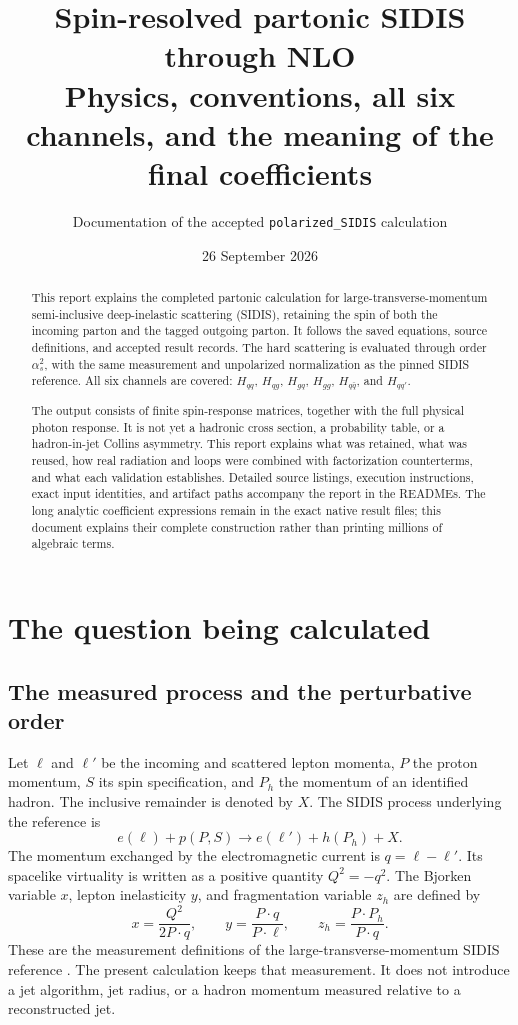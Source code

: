 \documentclass[11pt,a4paper]{article}
\title{Spin-resolved partonic SIDIS through NLO\\
\large Physics, conventions, all six channels, and the meaning of the final coefficients}
\author{Documentation of the accepted \texttt{polarized\_SIDIS} calculation}
\date{26 September 2026}
\newcommand{\as}{\alpha_s}
\begin{document}
\maketitle
\begin{abstract}
This report explains the completed partonic calculation for large-transverse-momentum semi-inclusive deep-inelastic scattering (SIDIS), retaining the spin of both the incoming parton and the tagged outgoing parton. It follows the saved equations, source definitions, and accepted result records. The hard scattering is evaluated through order $\as^2$, with the same measurement and unpolarized normalization as the pinned SIDIS reference. All six channels are covered: $H_{qq}$, $H_{qg}$, $H_{gq}$, $H_{gg}$, $H_{q\bar q}$, and $H_{qq'}$.

The output consists of finite spin-response matrices, together with the full physical photon response. It is not yet a hadronic cross section, a probability table, or a hadron-in-jet Collins asymmetry. This report explains what was retained, what was reused, how real radiation and loops were combined with factorization counterterms, and what each validation establishes. Detailed source listings, execution instructions, exact input identities, and artifact paths accompany the report in the READMEs. The long analytic coefficient expressions remain in the exact native result files; this document explains their complete construction rather than printing millions of algebraic terms.
\end{abstract}
\tableofcontents
\newpage

\section{The question being calculated}
\subsection{The measured process and the perturbative order}
Let $\ell$ and $\ell'$ be the incoming and scattered lepton momenta, $P$ the proton momentum, $S$ its spin specification, and $P_h$ the momentum of an identified hadron. The inclusive remainder is denoted by $X$. The SIDIS process underlying the reference is
\begin{equation}
 e(\ell)+p(P,S)\longrightarrow e(\ell')+h(P_h)+X.
\end{equation}
The momentum exchanged by the electromagnetic current is $q=\ell-\ell'$. Its spacelike virtuality is written as a positive quantity $Q^2=-q^2$. The Bjorken variable $x$, lepton inelasticity $y$, and fragmentation variable $z_h$ are defined by
\begin{equation}
 x=\frac{Q^2}{2P\cdot q},\qquad
 y=\frac{P\cdot q}{P\cdot\ell},\qquad
 z_h=\frac{P\cdot P_h}{P\cdot q}.
\end{equation}
These are the measurement definitions of the large-transverse-momentum SIDIS reference \cite{wang}. The present calculation keeps that measurement. It does not introduce a jet algorithm, jet radius, or a hadron momentum measured relative to a reconstructed jet.
\end{document}
